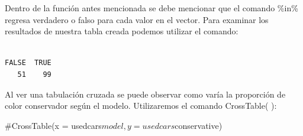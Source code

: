 \documentclass[
  letterpaper,
  DIV=11,
  numbers=noendperiod]{scrartcl}
\newenvironment{Shaded}{\begin{snugshade}}{\end{snugshade}}
\newcommand{\CommentTok}[1]{\textcolor[rgb]{0.37,0.37,0.37}{#1}}
\newcommand{\FunctionTok}[1]{\textcolor[rgb]{0.28,0.35,0.67}{#1}}
\newcommand{\NormalTok}[1]{\textcolor[rgb]{0.00,0.23,0.31}{#1}}
\newcommand{\SpecialCharTok}[1]{\textcolor[rgb]{0.37,0.37,0.37}{#1}}
\begin{document}
Dentro de la función antes mencionada se debe mencionar que el comando
\%in\% regresa verdadero o falso para cada valor en el vector. Para
examinar los resultados de nuestra tabla creada podemos utilizar el
comando:

\begin{Shaded}
\end{Shaded}

\begin{verbatim}

FALSE  TRUE 
   51    99 
\end{verbatim}

Al ver una tabulación cruzada se puede observar como varía la proporción
de color conservador según el modelo. Utilizaremos el comando
CrossTable( ):

\begin{Shaded}
\begin{Highlighting}[]
\CommentTok{\#CrossTable(x = usedcars$model, y = usedcars$conservative)}
\end{Highlighting}
\end{Shaded}
\end{document}
